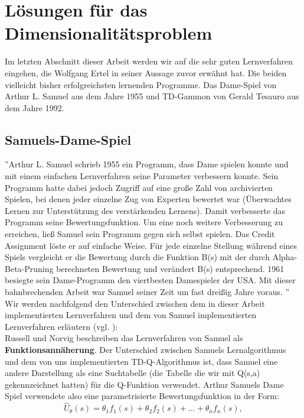 \section{Lösungen für das Dimensionalitätsproblem}
\label{sec:Ausblick}
Im letzten Abschnitt dieser Arbeit werden wir auf die sehr guten Lernverfahren eingehen, die Wolfgang Ertel in seiner Aussage zuvor erwähnt hat. Die beiden vielleicht bisher erfolgreichsten lernenden Programme. Das Dame-Spiel von Arthur L. Samuel aus dem Jahre 1955 und TD-Gammon von Gerald Tesauro aus dem Jahre 1992. 

\subsection{Samuels-Dame-Spiel}
''Arthur L. Samuel schrieb 1955 ein Programm, dass Dame spielen konnte und mit einem einfachen Lernverfahren seine Parameter verbessern konnte. Sein Programm hatte dabei jedoch Zugriff auf eine große Zahl von archivierten Spielen, bei denen jeder einzelne Zug von Experten bewertet war (Überwachtes Lernen zur Unterstützung des verstärkenden Lernens). Damit verbesserte das Programm seine Bewertungsfunktion. Um eine noch weitere Verbesserung zu erreichen, ließ Samuel sein Programm gegen sich selbst spielen. Das Credit Assignment löste er auf einfache Weise. Für jede einzelne Stellung während eines Spiels vergleicht er die Bewertung durch die Funktion B(s) mit der durch Alpha-Beta-Pruning berechneten Bewertung und verändert B(s) entsprechend. 1961 besiegte sein Dame-Programm den viertbesten Damespieler der USA. Mit dieser bahnbrechenden Arbeit war Samuel seiner Zeit um fast dreißig Jahre voraus. \cite[120\psq]{Ertel}''\\

Wir werden nachfolgend den Unterschied zwischen dem in dieser Arbeit implementierten Lernverfahren und dem von Samuel implementierten Lernverfahren erläutern (vgl. \cite[976]{Russell}): \\

Russell und Norvig beschreiben das Lernverfahren von Samuel als \textbf{Funktionsannäherung}. Der Unterschied zwischen Samuels Lernalgorithmus und dem von uns implementierten TD-Q-Algorithmus ist, dass Samuel eine andere Darstellung als eine Suchtabelle (die Tabelle die wir mit Q(s,a) gekennzeichnet hatten) für die Q-Funktion verwendet. Arthur Samuels Dame Spiel verwendete also eine parametrisierte Bewertungsfunktion in der Form: \\
\begin{equation*}
\hat{U}_\theta(s) = \theta_1 f_1(s) + \theta_2 f_2(s) + ... + \theta_n f_n(s),
\end{equation*}

